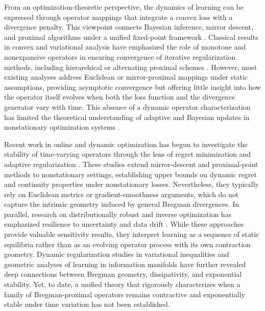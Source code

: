 \documentclass[11pt]{article}
\theoremstyle{plain}
\theoremstyle{definition}
\theoremstyle{remark}
\begin{document}
From an optimization-theoretic perspective,
the dynamics of learning can be expressed through
operator mappings that integrate a convex loss with a divergence penalty.
This viewpoint connects Bayesian inference,
mirror descent, and proximal algorithms
under a unified fixed-point framework
\cite{Beck2003,Bauschke2011,CombettesPesquet2011,Bubeck2015}.
Classical results in convex and variational analysis
have emphasized the role of monotone and nonexpansive operators
in ensuring convergence of iterative regularization methods,
including hierarchical or alternating proximal schemes
\cite{CombettesPennanen2004,Bolte2014}.
However, most existing analyses address
Euclidean or mirror-proximal mappings under static assumptions,
providing asymptotic convergence but offering little insight into
how the operator itself evolves
when both the loss function and the divergence generator vary with time.
This absence of a dynamic operator characterization
has limited the theoretical understanding of adaptive and Bayesian updates
in nonstationary optimization systems
\cite{Esfahani2018inverse,Bertsimas2022inverse,Blanchet2019,Scroccaro2025learning}.

Recent work in online and dynamic optimization
has begun to investigate the stability of time-varying operators
through the lens of regret minimization and adaptive regularization
\cite{Hall2015,Mokhtari2016,Ryu2016,Mertikopoulos2018,Cutkosky2019,Lee2024dynamic,Orabona2020}.
These studies extend mirror-descent and proximal-point methods
to nonstationary settings, establishing upper bounds on dynamic regret
and continuity properties under nonstationary losses.
Nevertheless, they typically rely on Euclidean metrics
or gradient-smoothness arguments, which do not capture
the intrinsic geometry induced by general Bregman divergences.
In parallel, research on distributionally robust and inverse optimization
has emphasized resilience to uncertainty and data drift
\cite{Duchi2023stability,Jin2023bayesian}.
While these approaches provide valuable sensitivity results,
they interpret learning as a sequence of static equilibria
rather than as an evolving operator process with its own contraction geometry.
Dynamic regularization studies in variational inequalities
\cite{Hsieh2023,Chen2022}
and geometric analyses of learning in information manifolds
\cite{Amari2021}
have further revealed deep connections between
Bregman geometry, dissipativity, and exponential stability.
Yet, to date, a unified theory that rigorously characterizes
when a family of Bregman-proximal operators
remains contractive and exponentially stable under time variation
has not been established.
\end{document}
